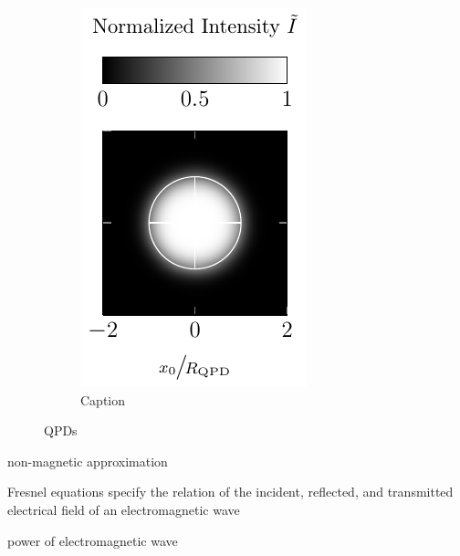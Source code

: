 \begin{figure}
\begin{subfigure}[b]{0.3\textwidth}
    \label{fig:Th-QPDy}
  \end{subfigure}
  \hfill
  \begin{subfigure}[b]{0.3\textwidth}
    \centering
    \includegraphics[]{Plots/cache/QPDt.pdf}
    \caption{Caption}
    \label{fig:Th-QPDt}
  \end{subfigure}
  \caption{QPDs}
  \label{fig:QPDs}
\end{figure}

\lipsum[1-2]

non-magnetic approximation

Fresnel equations specify the relation of the incident, reflected, and 
transmitted electrical field of an electromagnetic wave



power of electromagnetic wave

\cite[Chapter 7]{Jackson2013}





